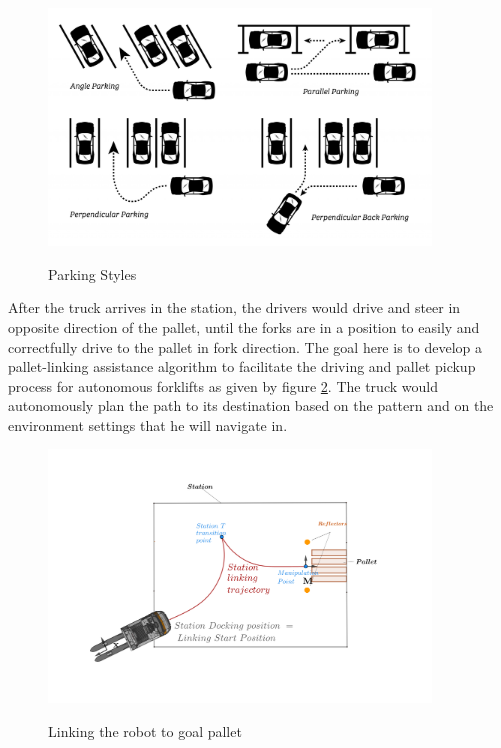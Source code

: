 \begin{figure}
    [H]
    \begin{center}
    \includegraphics[width=4in]{images/Chap2/perpendicular-parking-a-lot-scaled.jpg}\\
    \caption{Parking Styles}
    \label{Parking Styles}
    \end{center}
\end{figure}

After the truck arrives in the station, the drivers would drive and steer in opposite direction of the pallet, until the 
forks are in a position to easily and correctfully drive to the pallet in fork direction.
The goal here is to develop a pallet-linking assistance algorithm to facilitate the driving and pallet pickup process for 
autonomous forklifts as given by figure \ref{pattern}. The truck would autonomously plan the path to its destination
based on the pattern and on the environment settings that he will navigate in. 

\begin{figure}
    [H]
    \begin{center}
    \includegraphics[width=4in]{images/Chap2/station-without-subpolygones.png}\\
    \caption{Linking the robot to goal pallet}
    \label{pattern}
    \end{center}
\end{figure}
